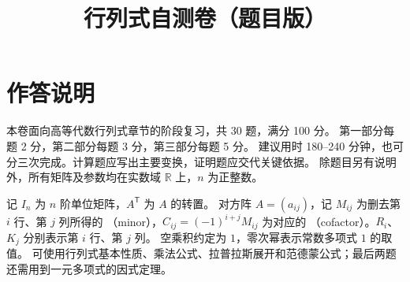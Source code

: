 \documentclass[UTF8,12pt,a4paper,fontset=fandol]{ctexart}
\title{行列式自测卷（题目版）}
\author{}
\date{}
\begin{document}
\maketitle

\section*{作答说明}
本卷面向高等代数行列式章节的阶段复习，共 30 题，满分 100 分。
第一部分每题 2 分，第二部分每题 3 分，第三部分每题 5 分。
建议用时 180--240 分钟，也可分三次完成。计算题应写出主要变换，证明题应交代关键依据。
除题目另有说明外，所有矩阵及参数均在实数域 $\mathbb R$ 上，$n$ 为正整数。

记 $I_n$ 为 $n$ 阶单位矩阵，$A^{\mathsf T}$ 为 $A$ 的转置。
对方阵 $A=(a_{ij})$，记 $M_{ij}$ 为删去第 $i$ 行、第 $j$ 列所得的
（minor），$C_{ij}=(-1)^{i+j}M_{ij}$ 为对应的
（cofactor）。$R_i$、$K_j$ 分别表示第 $i$ 行、第 $j$ 列。
空乘积约定为 $1$，零次幂表示常数多项式 $1$ 的取值。
可使用行列式基本性质、乘法公式、拉普拉斯展开和范德蒙公式；最后两题还需用到一元多项式的因式定理。
\end{document}
